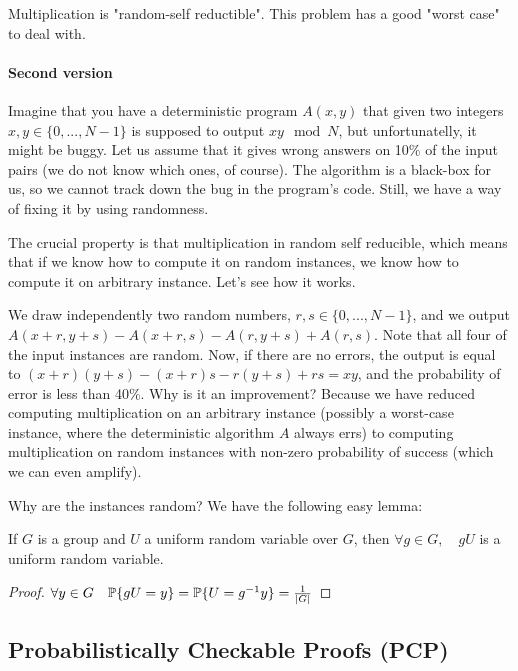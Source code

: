 Multiplication is "random-self reductible". This problem has a good "worst case" to deal with.

\paragraph{Second version}

Imagine that you have a deterministic program $A(x,y)$ that given two integers $x, y \in \{0,...,N-1\}$ is supposed to output $xy \mod N$, but unfortunatelly, it might be buggy. Let us assume that it gives wrong answers on 10\% of the input pairs (we do not know which ones, of course). The algorithm is a black-box for us, so we cannot track down the bug in the program's code. Still, we have a way of fixing it by using randomness.

The crucial property is that multiplication in random self reducible, which means that if we know how to compute it on random instances, we know how to compute it on arbitrary instance. Let's see how it works.

We draw independently two random numbers, $r, s \in \{0,...,N-1\}$, and we output $A(x+r, y+s) - A(x+r, s) - A(r, y+s) + A(r,s)$. Note that all four of the input instances are random. Now, if there are no errors, the output is equal to $(x+r)(y+s) - (x+r)s - r(y+s) + rs = xy$, and the probability of error is less than 40\%. 
Why is it an improvement? Because we have reduced computing multiplication on an arbitrary instance (possibly a worst-case instance, where the deterministic algorithm $A$ always errs) to computing multiplication on random instances with non-zero probability of success (which we can even amplify).

Why are the instances random? We have the following easy lemma:

\begin{lemma} If $G$ is a group and $U$ a uniform random variable over $G$, then $\forall g \in G, \quad gU$ is a uniform random variable.\end{lemma}
\begin{proof} $\forall y \in G \quad \mathbb{P}\{gU = y\} = \mathbb{P}\{U=g^{-1}y\} = {1 \over |G|}$ \end{proof}



\subsection{Probabilistically Checkable Proofs (PCP)}

